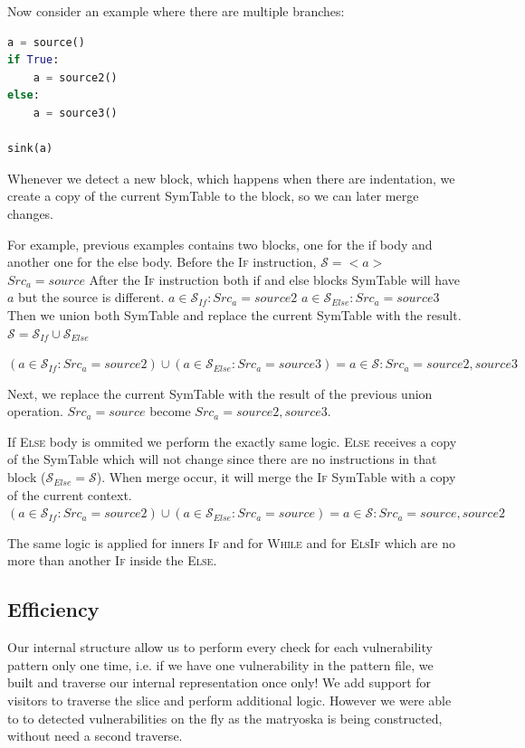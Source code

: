 Now consider an example where there are multiple branches:

\begin{lstlisting}[language=Python]
a = source()
if True:
    a = source2()
else:
    a = source3()

sink(a)
\end{lstlisting}

Whenever we detect a new block, which happens when there are indentation, we create a copy of the current SymTable
to the block, so we can later merge changes.

For example, previous examples contains two blocks, one for the if body and another one for the else body.
Before the \textsc{If} instruction, $\mathcal{S} = <a>$ $Src_a = source$
After the \textsc{If} instruction both if and else blocks SymTable will have $a$ but the source is different.
$a \in \mathcal{S}_{If}: Src_a = source2$ $a \in \mathcal{S}_{Else}: Src_a = source3$
Then we union both SymTable and replace the current SymTable with the result. $\mathcal{S} = \mathcal{S}_{If} \cup \mathcal{S}_{Else} $

$(a \in \mathcal{S}_{If}: Src_a = source2) \cup (a \in \mathcal{S}_{Else}: Src_a = source3) = a \in \mathcal{S}: Src_a = source2, source3$

Next, we replace the current SymTable with the result of the previous union operation. $Src_a = source$ become
$Src_a = source2, source3$.

If \textsc{Else} body is ommited we perform the exactly same logic. \textsc{Else} receives a copy of the SymTable
which will not change since there are no instructions in that block ($\mathcal{S}_{Else} = \mathcal{S}$). When merge occur, it will merge the \textsc{If}
SymTable with a copy of the current context.
$(a \in \mathcal{S}_{If}: Src_a = source2) \cup (a \in \mathcal{S}_{Else}: Src_a = source) = a \in \mathcal{S}: Src_a = source, source2$

The same logic is applied for inners \textsc{If} and for \textsc{While} and for \textsc{ElsIf} which are no more than
another \textsc{If} inside the \textsc{Else}.

\subsection*{Efficiency}
\label{sec:efficiency}
Our internal structure allow us to perform every check for each vulnerability pattern only one time, i.e.
if we have one vulnerability in the pattern file, we built and traverse our internal representation once only!
We add support for visitors to traverse the slice and perform additional logic. However we were able to
to detected vulnerabilities on the fly as the matryoska is being constructed, without need a second traverse.

